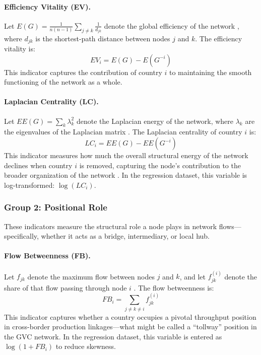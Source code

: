 \documentclass[12pt]{article}
\begin{document}
\paragraph{Efficiency Vitality (EV).} Let $E(G) = \frac{1}{n(n-1)}\sum_{j \neq k} \frac{1}{d_{jk}}$ denote the global efficiency of the network \citep{latora2001}, where $d_{jk}$ is the shortest-path distance between nodes $j$ and $k$. The efficiency vitality is:
\begin{equation}
EV_i = E(G) - E(G^{-i})
\end{equation}
This indicator captures the contribution of country $i$ to maintaining the smooth functioning of the network as a whole.

\paragraph{Laplacian Centrality (LC).} Let $EE(G) = \sum_k \lambda_k^2$ denote the Laplacian energy of the network, where $\lambda_k$ are the eigenvalues of the Laplacian matrix \citep{qi2010}. The Laplacian centrality of country $i$ is:
\begin{equation}
LC_i = EE(G) - EE(G^{-i})
\end{equation}
This indicator measures how much the overall structural energy of the network declines when country $i$ is removed, capturing the node's contribution to the broader organization of the network \citep{lu2016}. In the regression dataset, this variable is log-transformed: $\log(LC_i)$.

\subsubsection*{Group 2: Positional Role}

These indicators measure the structural role a node plays in network flows---specifically, whether it acts as a bridge, intermediary, or local hub.

\paragraph{Flow Betweenness (FB).} Let $f_{jk}$ denote the maximum flow between nodes $j$ and $k$, and let $f_{jk}^{(i)}$ denote the share of that flow passing through node $i$ \citep{freeman1991, borgatti2005}. The flow betweenness is:
\begin{equation}
FB_i = \sum_{j \neq k \neq i} f_{jk}^{(i)}
\end{equation}
This indicator captures whether a country occupies a pivotal throughput position in cross-border production linkages---what might be called a ``tollway'' position in the GVC network. In the regression dataset, this variable is entered as $\log(1 + FB_i)$ to reduce skewness.
\end{document}
